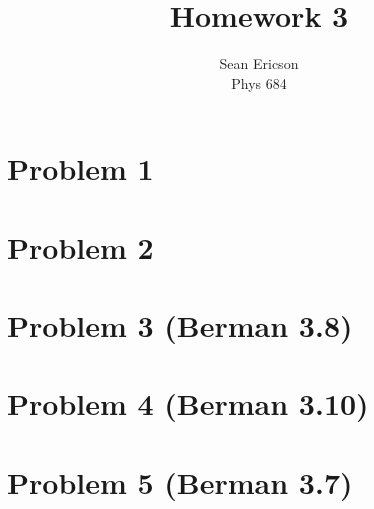 \documentclass[12pt]{article}
\begin{document}
	
\title{Homework 3}
\author{Sean Ericson \\ Phys 684}
\maketitle

\section*{Problem 1}

\section*{Problem 2}

\section*{Problem 3 (Berman 3.8)}

\section*{Problem 4 (Berman 3.10)}

\section*{Problem 5 (Berman 3.7)}


\end{document}
